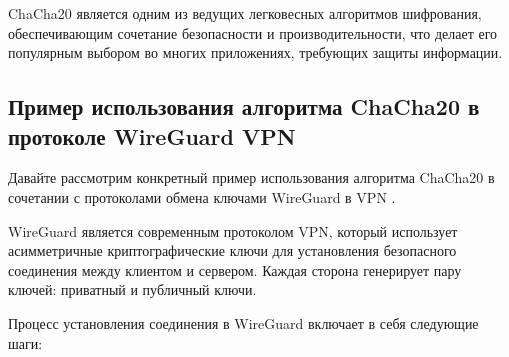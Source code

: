 \documentclass[12pt]{article}
\begin{document}
    ChaCha20 является одним из ведущих легковесных алгоритмов шифрования, обеспечивающим сочетание безопасности и производительности, что делает его популярным выбором во многих приложениях, требующих защиты информации.

    \subsection{Пример использования алгоритма ChaCha20 в протоколе WireGuard VPN}
    Давайте рассмотрим конкретный пример использования алгоритма ChaCha20 в сочетании с протоколами обмена ключами WireGuard в VPN .

    WireGuard является современным протоколом VPN, который использует асимметричные криптографические ключи для установления безопасного соединения между клиентом и сервером.
    Каждая сторона генерирует пару ключей: приватный и публичный ключи.

    Процесс установления соединения в WireGuard включает в себя следующие шаги:
\end{document}
